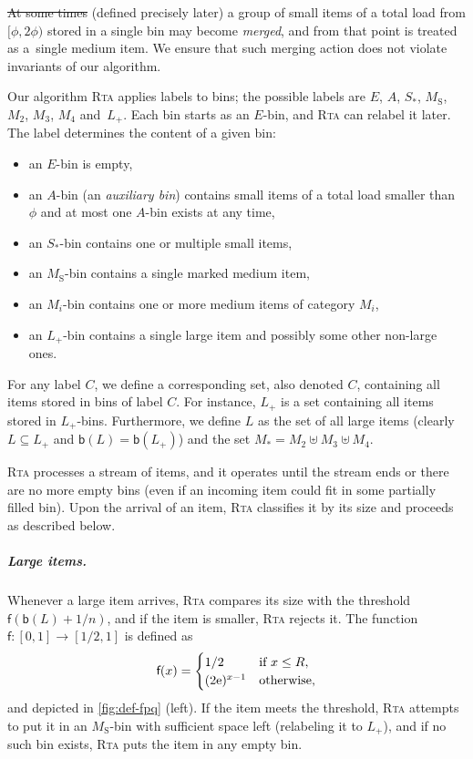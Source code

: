 \documentclass[a4paper,USenglish,cleveref]{lipics-v2019}
\newcommand{\e}{\mathrm{e}}
\newcommand{\R}{\ensuremath{R}}
\newcommand{\LG}{\ensuremath{L}\xspace}
\newcommand{\M}{\ensuremath{M_\mathrm{S}}\xspace}
\newcommand{\A}{\ensuremath{A}\xspace}
\newcommand{\ST}{\ensuremath{S_*}\xspace}
\newcommand{\MT}{\ensuremath{M_*}\xspace}
\newcommand{\MTI}[1]{\ensuremath{M_{#1}\xspace}}
\newcommand{\LT}{\ensuremath{L_+}\xspace}
\newcommand{\emptyBucket}{\ensuremath{E}\xspace}
\newcommand{\smallBoundary}{\ensuremath{\phi}}
\newcommand{\f}{\textsf{f}}
\newcommand{\B}{\textsf{b}}
\newcommand{\ALG}{\textsc{Rta}\xspace}
\newcommand\maciek[1]{\texthl{#1}}
\begin{document}
\st{At some times} \maciek{Under certain conditions} (defined precisely later) a group of small items of a total load
from $[\smallBoundary, 2 \smallBoundary)$ stored in a single bin may
become \emph{merged}, and from that point is treated as a~single medium item. We
ensure that such merging action does not violate invariants of our algorithm.

Our algorithm \ALG applies labels to bins; the possible labels are \emptyBucket,
\A, \ST, \M, $\MTI{2}$, $\MTI{3}$, $\MTI{4}$ and~\LT. Each bin starts as an
\emptyBucket-bin, and \ALG can relabel it later. The label determines
the content of a given bin:
%
\begin{itemize}
  \item an $\emptyBucket$-bin is empty,
  \item an \A-bin (an \emph{auxiliary bin}) contains small items of a total load 
      smaller than $\smallBoundary$ and at most one \A-bin exists at any time,
  \item an \ST-bin contains one or multiple small items,
  \item an \M-bin contains a single marked medium item,
  \item an $\MTI{i}$-bin contains one or more medium items of
  category $\MTI{i}$,
  \item an \LT-bin contains a single large item and possibly some other non-large ones.
\end{itemize}
For any label $C$, we define a corresponding set, also denoted $C$, containing all items
stored in bins of label $C$. For instance, \LT is a set containing 
all items stored in \LT-bins.
Furthermore, we define \LG as the set of all large items (clearly $\LG \subseteq \LT$
and $\B(\LG) = \B(\LT)$)
and the set $\MT = \MTI{2} \uplus \MTI{3} \uplus \MTI{4}$.




\ALG processes a stream of items, and it operates until the stream ends or there
are no more empty bins (even if an incoming item could fit in some partially
filled bin). Upon the arrival of an item, \ALG classifies it by its size and
proceeds as described below. 

\subparagraph{Large items.}

Whenever a large item arrives, \ALG compares its size with the threshold
$\f(\B(\LG) + 1/n)$, and if the item is smaller, \ALG rejects it.
The function $\f: [0,1] \to [1/2,1]$ is defined as 
\begin{equation}
\label{eq:f-definition}
   \f(x) =
\begin{cases}
  1/2 &\mbox{if } x \leq \R, \\
  (2\e)^{x-1} & \textnormal{otherwise,}
\end{cases}
\end{equation}
and depicted in \cref{fig:def-fpq} (left).
If the item meets the threshold, \ALG attempts to put it in an \M-bin
with sufficient space left (relabeling it to \LT), and if no
such bin exists, \ALG puts the item in any empty bin.
\end{document}
